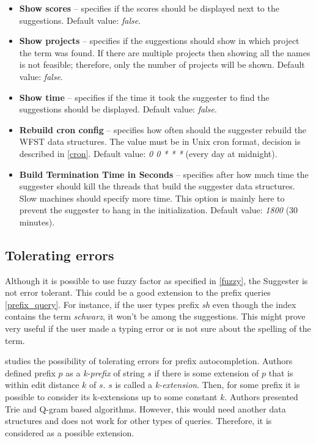\begin{itemize}
    \item \textbf{Show scores} – specifies if the scores should be displayed next to the suggestions.
    Default value: \textit{false}.
    \item \textbf{Show projects} – specifies if the suggestions should show in which project the term was found.
    If there are multiple projects then showing all the names is not feasible; therefore, only the number of projects will be shown.
    Default value: \textit{false}.
    \item \textbf{Show time} – specifies if the time it took the suggester to find the suggestions should be displayed.
    Default value: \textit{false}.
    \item \textbf{Rebuild cron config} – specifies how often should the suggester rebuild the WFST data structures.
    The value must be in Unix cron format, decision is described in \ref{cron}.  Default value: \textit{0 0 * * *} (every day at midnight).
    \item \textbf{Build Termination Time in Seconds} – specifies after how much time the suggester should kill the
    threads that build the suggester data structures. Slow machines should specify more time. This option is mainly here
    to prevent the suggester to hang in the initialization. Default value: \textit{1800} (30 minutes).
\end{itemize}

\subsection{Tolerating errors}
Although it is possible to use fuzzy factor as specified in \ref{fuzzy}, the Suggester is not error tolerant.
This could be a good extension to the prefix queries \ref{prefix_query}.
For instance, if the user types prefix \textit{sh} even though
the index contains the term \textit{schwarz}, it won't be among the suggestions. This might prove very useful if the
user made a typing error or is not sure about the spelling of the term.

\citep{Chaudhuri09extendingautocompletion} studies the possibility of tolerating errors for prefix autocompletion.
Authors defined prefix $p$ as a \textit{k-prefix} of string $s$ if there is some extension of $p$ that is within edit
distance $k$ of $s$. $s$ is called a \textit{k-extension}. Then, for some prefix it is possible to consider its
k-extensions up to some constant $k$. Authors presented Trie and Q-gram based algorithms. However, this would need
another data structures and does not work for other types of queries. Therefore, it is considered as a possible extension.
